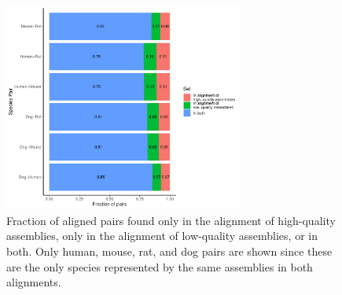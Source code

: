 \documentclass{article}
\newcommand{\todo}[1]{\textbf{\textsc{\textcolor{red}{(TODO: #1)}}}}
\begin{document}
\begin{figure}
\begin{center}
\includegraphics[width=0.7\textwidth]{new_vs_old_assemblies_aligned_pairs}
\caption{Fraction of aligned pairs found only in the alignment of high-quality assemblies, only in the alignment of low-quality assemblies, or in both. Only human, mouse, rat, and dog pairs are shown since these are the only species represented by the same assemblies in both alignments. %
} \label{fig:new_vs_old_assemblies_aligned_pairs}
\end{center}
\end{figure}
\end{document}
